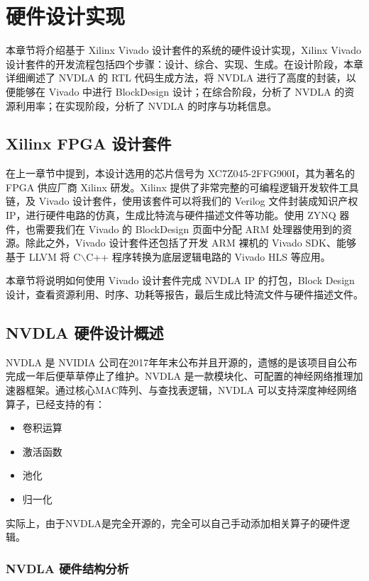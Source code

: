 \chapter{硬件设计实现}\label{chap:hardware}

本章节将介绍基于 Xilinx Vivado 设计套件的系统的硬件设计实现，Xilinx Vivado 设计套件的开发流程包括四个步骤：设计、综合、实现、生成。在设计阶段，本章详细阐述了 NVDLA 的 RTL 代码生成方法，将 NVDLA 进行了高度的封装，以便能够在 Vivado 中进行 BlockDesign 设计；在综合阶段，分析了 NVDLA 的资源利用率；在实现阶段，分析了 NVDLA 的时序与功耗信息。

\section{Xilinx FPGA 设计套件}

在上一章节中提到，本设计选用的芯片信号为 XC7Z045-2FFG900I，其为著名的 FPGA 供应厂商 Xilinx 研发。Xilinx 提供了非常完整的可编程逻辑开发软件工具链，及 Vivado 设计套件，使用该套件可以将我们的 Verilog 文件封装成知识产权 IP，进行硬件电路的仿真，生成比特流与硬件描述文件等功能。使用 ZYNQ 器件，也需要我们在 Vivado 的 BlockDesign 页面中分配 ARM 处理器使用到的资源。除此之外，Vivado 设计套件还包括了开发 ARM 裸机的 Vivado SDK、能够基于 LLVM 将 C$\backslash$C++ 程序转换为底层逻辑电路的 Vivado HLS 等应用。

本章节将说明如何使用 Vivado 设计套件完成 NVDLA IP 的打包，Block Design 设计，查看资源利用、时序、功耗等报告，最后生成比特流文件与硬件描述文件。 

\section{NVDLA 硬件设计概述}

NVDLA 是 NVIDIA 公司在2017年年末公布并且开源的，遗憾的是该项目自公布完成一年后便草草停止了维护。NVDLA 是一款模块化、可配置的神经网络推理加速器框架。通过核心MAC阵列、与查找表逻辑，NVDLA 可以支持深度神经网络算子，已经支持的有：

\begin{itemize}
    \item 卷积运算
    \item 激活函数
    \item 池化
    \item 归一化
\end{itemize}

实际上，由于NVDLA是完全开源的，完全可以自己手动添加相关算子的硬件逻辑。

\subsection{NVDLA 硬件结构分析}

